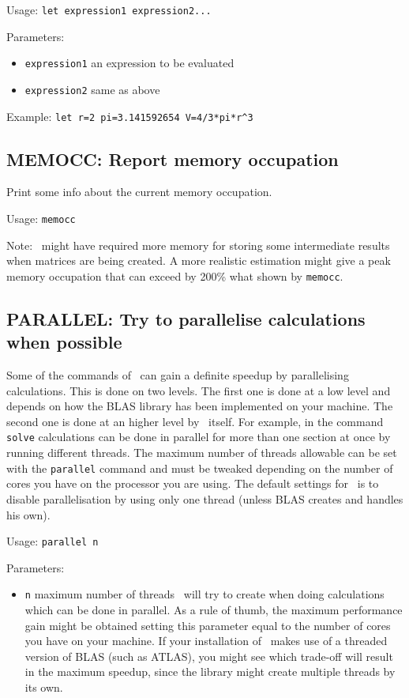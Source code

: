     Usage: \lstinline!let expression1 expression2...!
    
    Parameters:
    \begin{itemize}
    \item\lstinline!expression1! an expression to be evaluated
    \item\lstinline!expression2! same as above
    \end{itemize}
    
    Example: \lstinline!let r=2 pi=3.141592654 V=4/3*pi*r^3!
     

\subsection{MEMOCC: Report memory occupation}
Print some info about the current memory occupation.

    Usage: \lstinline!memocc!
    
Note: \afmm\ might have required more memory for storing some intermediate results when matrices are being created. A more realistic estimation might give a peak memory occupation that can exceed by 200\% what shown by \lstinline!memocc!.

\subsection{PARALLEL: Try to parallelise calculations when possible}
Some of the commands of \afmm\ can gain a definite speedup by parallelising
calculations. This is done on two levels. The first one is done at a low level and depends on how the BLAS library has been implemented on your machine. The second one is done at an higher level by \afmm\ itself. For example, in the command \lstinline!solve! calculations can be done in parallel for more than one section at once by running different threads. The maximum number of threads allowable can be set with the \lstinline!parallel! command and must be tweaked depending on the number of cores you have on the processor you are using. The default settings for \afmm\ is to disable parallelisation by using only one thread (unless BLAS creates and handles his own).

    Usage: \lstinline!parallel n!
    
Parameters:
    \begin{itemize}
    \item\lstinline!n! maximum number of threads \afmm\ will try to create when
    doing calculations which can be done in parallel. As a rule of thumb, the maximum performance gain might be obtained setting this parameter equal to the number of cores you have on your machine. If your installation of \afmm\ makes use of a threaded version of BLAS (such as ATLAS), you might see which trade-off will result in the maximum speedup, since the library might create multiple threads by its own.
    \end{itemize}

